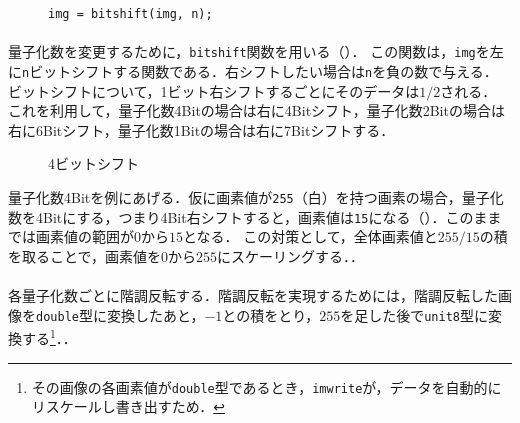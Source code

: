 \begin{wrapfigure}{r}[0mm]{.3\textwidth}
    \centering
    \vspace{-.7cm}
    \begin{lstlisting}[caption={\texttt{bitshift}関数},label={src:bitshift}]
img = bitshift(img, n);
    \end{lstlisting}
    \vspace{-.5cm}
\end{wrapfigure}
\paragraph{\kadaiab}
量子化数を変更するために，\texttt{bitshift}関数を用いる（）．
この関数は，\texttt{img}を左に\texttt{n}ビットシフトする関数である．右シフトしたい場合は\texttt{n}を負の数で与える．
ビットシフトについて，1ビット右シフトするごとにそのデータは\(1/2\)される．
これを利用して，量子化数4Bitの場合は右に4Bitシフト，量子化数2Bitの場合は右に6Bitシフト，量子化数1Bitの場合は右に7Bitシフトする．

\begin{wrapfigure}{r}[0mm]{.225\textwidth}
    \centering
    \vspace{-.5cm}
    \caption{4ビットシフト}
    \label{fig:4ビットシフト}
    \vspace{-.5cm}
\end{wrapfigure}
量子化数4Bitを例にあげる．仮に画素値が\texttt{255}（白）を持つ画素の場合，量子化数を4Bitにする，つまり4Bit右シフトすると，画素値は\texttt{15}になる（）．このままでは画素値の範囲が\(0\)から\(15\)となる．
この対策として，全体画素値と\(255/15\)の積を取ることで，画素値を\(0\)から\(255\)にスケーリングする．\scall{\kadaiab}．
\paragraph{\kadaiac}
各量子化数ごとに階調反転する．階調反転を実現するためには，階調反転した画像を\texttt{double}型に変換したあと，\(-1\)との積をとり，\(255\)を足した後で\texttt{unit8}型に変換する\footnote{その画像の各画素値が\texttt{double}型であるとき，\texttt{imwrite}が，データを自動的にリスケールし書き出すため．}．\scall{\kadaiac}．

